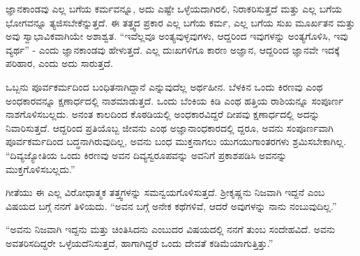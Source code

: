 ಜ್ಞಾನಕಾಂಡವು ಎಲ್ಲ ಬಗೆಯ ಕರ್ಮವನ್ನೂ, ಅದು ಎಷ್ಟೇ ಒಳ್ಳೆಯದಾಗಿರಲಿ, ನಿರಾಕರಿಸುತ್ತದೆ ಮತ್ತು ಎಲ್ಲ ಬಗೆಯ ಭೋಗವನ್ನೂ ತ್ಯಜಿಸಬೇಕೆನ್ನುತ್ತದೆ. ಈ ತತ್ತ್ವದ ಪ್ರಕಾರ ಎಲ್ಲ ಬಗೆಯ ಕರ್ಮ, ಎಲ್ಲ ಬಗೆಯ ಸುಖ ಮೂರ್ಖತನ ಮತ್ತು ಅವು ಸ್ವಾಭಾವಿಕವಾಗಿಯೇ ಅಶಾಶ್ವತ. “ಇವೆಲ್ಲವೂ ಅಂತ್ಯವುಳ್ಳವುಗಳು, ಆದ್ದರಿಂದ ಇವುಗಳನ್ನು ಅಂತ್ಯಗೊಳಿಸಿ, ಇವು ವ್ಯರ್ಥ” - ಎಂದು ಜ್ಞಾನಕಾಂಡವು ಹೇಳುತ್ತದೆ. ಎಲ್ಲ ದುಃಖಗಳಿಗೂ ಕಾರಣ ಅಜ್ಞಾನ, ಆದ್ದರಿಂದ ಜ್ಞಾನವೇ ಇದಕ್ಕೆ ಪರಿಹಾರ, ಎಂದು ಅದು ಸಾರುತ್ತದೆ.

ಒಬ್ಬನು ಪೂರ್ವಕರ್ಮದಿಂದ ಬಂಧಿತನಾಗಿದ್ದಾನೆ ಎನ್ನುವುದೆಲ್ಲ ಅರ್ಥಹೀನ. ಬೆಳಕಿನ ಒಂದು ಕಿರಣವು ಎಂಥ ಅಂಧಕಾರವನ್ನೂ ಕ್ಷಣಾರ್ಧದಲ್ಲಿ ನಾಶಮಾಡುತ್ತದೆ. ಒಂದು ಬೆಂಕಿಯ ಕಿಡಿ ಎಂಥ ಹತ್ತಿಯ ರಾಶಿಯನ್ನೂ ಸಂಪೂರ್ಣ ನಾಶಗೊಳಿಸಬಲ್ಲದು. ಅನಂತ ಕಾಲದಿಂದ ಕೊಠಡಿಯಲ್ಲಿ ಅಂಧಕಾರವಿದ್ದರೆ ದೀಪವು ಕ್ಷಣಾರ್ಧದಲ್ಲಿ ಅದನ್ನು ನಿವಾರಿಸುತ್ತದೆ. ಆದ್ದರಿಂದ ಪ್ರತಿಯೊಬ್ಬ ಜೀವನು ಎಂಥ ಅಜ್ಞಾನಾಂಧಕಾರದಲ್ಲಿ ದ್ದರೂ, ಅವನು ಸಂಪೂರ್ಣವಾಗಿ ಪೂರ್ವಕರ್ಮದಿಂದ ಬದ್ಧನಾಗಿರುವುದಿಲ್ಲ, ಅವನು ಬಂಧ ಮುಕ್ತನಾಗಲು ಯುಗಯುಗಾಂತರಗಳು ಶ್ರಮಿಸಬೇಕಾಗಿಲ್ಲ. “ದಿವ್ಯಜ್ಯೋತಿಯ ಒಂದು ಕಿರಣವು ಅವನ ದಿವ್ಯಸ್ವರೂಪವನ್ನು ಅವನಿಗೆ ಪ್ರಕಾಶಪಡಿಸಿ ಅವನನ್ನು ಮುಕ್ತಗೊಳಿಸಬಲ್ಲದು.”

ಗೀತೆಯು ಈ ಎಲ್ಲ ವಿರೋಧಾತ್ಮಕ ತತ್ತ್ವಗಳನ್ನು ಸಮನ್ವಯಗೊಳಿಸುತ್ತದೆ. ಶ‍್ರೀಕೃಷ್ಣನು ನಿಜವಾಗಿ ಇದ್ದನೆ ಎಂಬ ವಿಷಯದ ಬಗ್ಗೆ ನನಗೆ ತಿಳಿಯದು. “ಅವನ ಬಗ್ಗೆ ಅನೇಕ ಕಥೆಗಳಿವೆ, ಆದರೆ ಅವುಗಳನ್ನು ನಾನು ನಂಬುವುದಿಲ್ಲ.”

“ಅವನು ನಿಜವಾಗಿ ಇದ್ದನು ಮತ್ತು ಚಿಂತಿಸಿದನು ಎಂಬುದರ ವಿಷಯದಲ್ಲಿ ನನಗೆ ತುಂಬ ಸಂದೇಹವಿದೆ. ಅವನು ಅವತರಿಸದಿದ್ದರೇ ಒಳ್ಳೆಯದೆನಿಸುತ್ತದೆ, ಹಾಗಾಗಿದ್ದರೆ ಒಂದು ದೇವತೆ ಕಡಿಮೆಯಾಗುತ್ತಿತ್ತು.”

